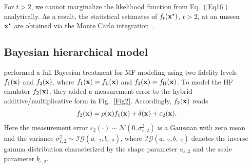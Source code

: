 \documentclass[iicol,sn-basic]{sn-jnl}%
\theoremstyle{thmstyleone}%
\theoremstyle{thmstyletwo}
\theoremstyle{thmstylethree}
\begin{document}
\begin{linenumbers}
For $t>2$, we cannot marginalize the likelihood function from Eq.~(\ref{Eq16}) analytically.
As a result, the statistical estimates of $f_{t}({\bf x^\star})$, $t>2$, at an unseen $\bf x^\star$ are obtained via the Monte Carlo integration~\citep{Perdikaris2017}.

\subsection{Bayesian hierarchical model}\label{Sec53}

\cite{Qian2008} performed a full Bayesian treatment for MF modeling using two fidelity levels $f_1({\bf x})$ and $f_2({\bf x})$, where $f_1({\bf x})= f_\text{L}({\bf x})$ and $f_2({\bf x})= f_\text{H}({\bf x})$.
To model the HF emulator $f_\text{2}({\bf x})$, they added a measurement error to the hybrid additive/multiplicative form in Fig.~\ref{Fig2}.
Accordingly, $f_\text{2}({\bf x})$ reads
\begin{equation}\label{Eq18}
f_\text{2}({\bf x}) = \rho({\bf x})f_\text{1}({\bf x}) + \delta({\bf x})+\varepsilon_2({\bf x}).
\end{equation}
Here the measurement error $\varepsilon_\text{2}(\cdot) \sim \mathcal{N}(0,\sigma^2_{\varepsilon,2})$ is a Gaussian with zero mean and the variance $\sigma^2_{\varepsilon,2} \sim \mathcal{IG}(a_{\varepsilon,2},b_{\varepsilon,2})$, where $\mathcal{IG}(a_{\varepsilon,2},b_{\varepsilon,2})$ denotes the inverse gamma distribution characterized by the shape parameter $a_{\varepsilon,2}$ and the scale parameter $b_{\varepsilon,2}$.


\end{linenumbers}
\end{document}
